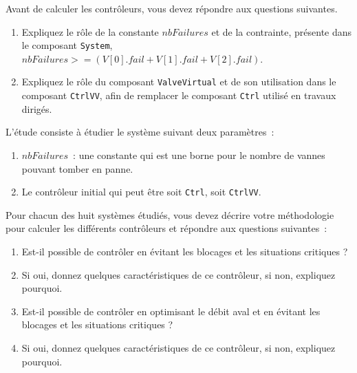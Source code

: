 Avant de calculer les contrôleurs, vous devez répondre aux questions suivantes.
\begin{enumerate}
\item Expliquez le rôle de la constante $nbFailures$ et de la contrainte, présente dans le composant {\tt System}, $nbFailures >= (V[0].fail + V[1].fail + V[2].fail)$.
\item Expliquez le rôle du composant {\tt ValveVirtual} et de son utilisation dans le composant {\tt CtrlVV}, afin de remplacer le composant {\tt Ctrl} utilisé en travaux dirigés.
\end{enumerate}

L'étude consiste à étudier le système suivant deux paramètres~:
\begin{enumerate}
\item $nbFailures$~: une constante qui est une borne pour le nombre de vannes pouvant tomber en panne.
\item Le contrôleur initial qui peut être soit {\tt Ctrl}, soit {\tt CtrlVV}.
\end{enumerate}

Pour chacun des huit systèmes étudiés, vous devez décrire votre méthodologie pour calculer les différents contrôleurs et répondre aux questions suivantes~:

\begin{enumerate}
\item Est-il possible de contrôler en évitant les blocages et les situations critiques ?
\item Si oui, donnez quelques caractéristiques de ce contrôleur, si non, expliquez pourquoi.
\item Est-il possible de contrôler en optimisant le débit aval et en évitant les blocages et les situations critiques ?
\item Si oui, donnez quelques caractéristiques de ce contrôleur, si non, expliquez pourquoi.
\end{enumerate}
